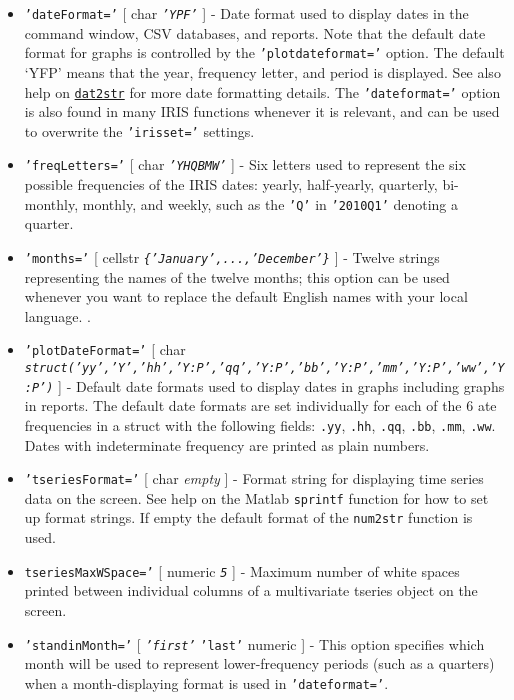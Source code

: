 \begin{itemize}
\item
  \texttt{'dateFormat='} {[} char \textbar{} \emph{\texttt{'YPF'}} {]} -
  Date format used to display dates in the command window, CSV
  databases, and reports. Note that the default date format for graphs
  is controlled by the \texttt{'plotdateformat='} option. The default
  `YFP' means that the year, frequency letter, and period is displayed.
  See also help on \href{dates/dat2str}{\texttt{dat2str}} for more date
  formatting details. The \texttt{'dateformat='} option is also found in
  many IRIS functions whenever it is relevant, and can be used to
  overwrite the \texttt{'irisset='} settings.
\item
  \texttt{'freqLetters='} {[} char \textbar{} \emph{\texttt{'YHQBMW'}}
  {]} - Six letters used to represent the six possible frequencies of
  the IRIS dates: yearly, half-yearly, quarterly, bi-monthly, monthly,
  and weekly, such as the \texttt{'Q'} in \texttt{'2010Q1'} denoting a
  quarter.
\item
  \texttt{'months='} {[} cellstr \textbar{}
  \emph{\texttt{\{'January',...,'December'\}}} {]} - Twelve strings
  representing the names of the twelve months; this option can be used
  whenever you want to replace the default English names with your local
  language. .
\item
  \texttt{'plotDateFormat='} {[} char \textbar{}
  \emph{\texttt{struct('yy','Y','hh','Y:P','qq','Y:P','bb','Y:P','mm','Y:P','ww','Y:P')}}
  {]} - Default date formats used to display dates in graphs including
  graphs in reports. The default date formats are set individually for
  each of the 6 ate frequencies in a struct with the following fields:
  \texttt{.yy}, \texttt{.hh}, \texttt{.qq}, \texttt{.bb}, \texttt{.mm},
  \texttt{.ww}. Dates with indeterminate frequency are printed as plain
  numbers.
\item
  \texttt{'tseriesFormat='} {[} char \textbar{} \emph{empty} {]} -
  Format string for displaying time series data on the screen. See help
  on the Matlab \texttt{sprintf} function for how to set up format
  strings. If empty the default format of the \texttt{num2str} function
  is used.
\item
  \texttt{tseriesMaxWSpace='} {[} numeric \textbar{} \emph{\texttt{5}}
  {]} - Maximum number of white spaces printed between individual
  columns of a multivariate tseries object on the screen.
\item
  \texttt{'standinMonth='} {[} \emph{\texttt{'first'}} \textbar{}
  \texttt{'last'} \textbar{} numeric {]} - This option specifies which
  month will be used to represent lower-frequency periods (such as a
  quarters) when a month-displaying format is used in
  \texttt{'dateformat='}.
\end{itemize}

